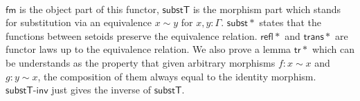 \begin{code}
\\
\>[2]\<[10]%
\>[10]\AgdaSymbol{\{} \AgdaSymbol{:} \AgdaFunction{[}  \AgdaFunction{]}   \AgdaSymbol{\}}\<%
\\
\>[2]\<[10]%
\>[10]\AgdaSymbol{\{} \AgdaSymbol{:}    \AgdaSymbol{\}}  \<[27]%
\>[27]\<%
\\
\>[2]\<[10]%
\>[10]\AgdaFunction{[}   \AgdaFunction{]}   \AgdaSymbol{(}  \AgdaSymbol{)}  \<%
\\
\>[0]\<[2]%
\>[2] \AgdaSymbol{=} \AgdaFunction{[}  \AgdaSymbol{\_} \AgdaFunction{]trans} \AgdaSymbol{(} \AgdaSymbol{\_)} \<%
\\
%
\\
\>[0]\<[2]%
\>[2] \AgdaSymbol{:} \AgdaSymbol{\{}  \AgdaSymbol{:}   \AgdaSymbol{\}}  \<[31]%
\>[31]\<%
\\
\>[2]\<[13]%
\>[13]\AgdaFunction{[}  \AgdaFunction{]}   \AgdaSymbol{)} \<%
\\
\>[2]\<[13]%
\>[13]     \<[24]%
\>[24]\<%
\\
\>[2]\<[13]%
\>[13]   \<%
\\
\>[0]\<[2]%
\>[2]   \AgdaSymbol{=}  \AgdaSymbol{(}\AgdaFunction{[}  \AgdaFunction{]sym} \AgdaSymbol{)} \<%
\\
\>\<\end{code}

$\mathsf{fm}$ is the object part of this functor, $\mathsf{substT}$ is the morphism part which stands for substitution via an equivalence $x \sim y$ for $x , y : \Gamma$. $\mathsf{subst*}$ states that the functions between setoids preserve the equivalence relation. $\mathsf{refl*}$ and $\mathsf{trans*}$ are functor laws up to the equivalence relation. We also prove a lemma $\mathsf{tr*}$ which can be understands as the property that given arbitrary morphisms $f : x \sim x$ and $g : y \sim x$, the composition of them always equal to the identity morphism. $\mathsf{substT\text{-}inv}$ just gives the inverse of $\mathsf{substT}$.

